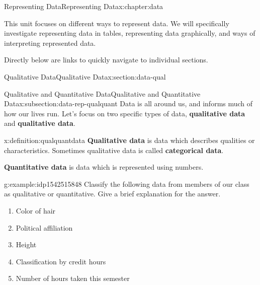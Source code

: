 \documentclass[oneside,10pt,]{book}
\newcommand{\terminology}[1]{\textbf{#1}}
\begin{document}
\begin{chapterptx}{Representing Data}{}{Representing Data}{}{}{x:chapter:data}
\begin{introduction}{}%
This unit focuses on different ways to represent data.  We will specifically investigate representing data in tables, representing data graphically, and ways of interpreting represented data.%
\par
Directly below are links to quickly navigate to individual sections.%
\end{introduction}%
%
%
\typeout{************************************************}
\typeout{************************************************}
%
\begin{sectionptx}{Qualitative Data}{}{Qualitative Data}{}{}{x:section:data-qual}
%
%
\typeout{************************************************}
\typeout{************************************************}
%
\begin{subsectionptx}{Qualitative and Quantitative Data}{}{Qualitative and Quantitative Data}{}{}{x:subsection:data-rep-qualquant}
Data is all around us, and informs much of how our lives run.  Let's focus on two specific types of data, \terminology{qualitative data} and \terminology{qualitative data}.%
\begin{definition}{}{x:definition:qualquantdata}%
\terminology{Qualitative data} is data which describes qualities or characteristics.  Sometimes qualitative data is called \terminology{categorical data}.%
\par
\terminology{Quantitative data} is data which is represented using numbers.%
%
%
%
\end{definition}
\begin{example}{}{g:example:idp1542515848}%
Classify the following data from members of our class as qualitative or quantitative.  Give a brief explanation for the answer. %
\begin{enumerate}[label=\alph*]
\item{}Color of hair%
\item{}Political affiliation%
\item{}Height%
\item{}Classification by credit hours%
\item{}Number of hours taken this semester%
\end{enumerate}
\par\smallskip%

\end{example}
\end{subsectionptx}
\end{sectionptx}
\end{chapterptx}
\end{document}
